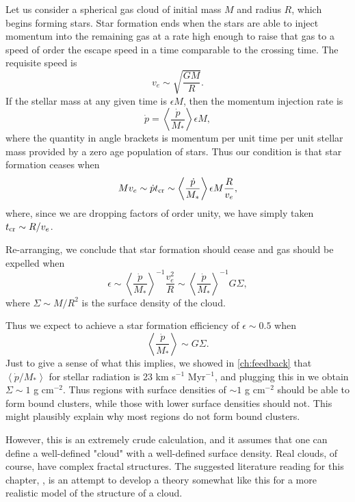 Let us consider a spherical gas cloud of initial mass $M$ and radius $R$, which begins forming stars. Star formation ends when the stars are able to inject momentum into the remaining gas at a rate high enough to raise that gas to a speed of order the escape speed in a time comparable to the crossing time. The requisite speed is
\begin{equation}
v_e \sim \sqrt{\frac{G M}{R}}.
\end{equation}
If the stellar mass at any given time is $\epsilon M$, then the momentum injection rate is
\begin{equation}
\dot{p} = \left\langle\frac{\dot{p}}{M_*}\right\rangle \epsilon M,
\end{equation}
where the quantity in angle brackets is momentum per unit time per unit stellar mass provided by a zero age population of stars. Thus our condition is that star formation ceases when
\begin{equation}
M v_e \sim \dot{p} t_{\rm cr} \sim \left\langle\frac{\dot{p}}{M_*}\right\rangle \epsilon M \frac{R}{v_e},
\end{equation}
where, since we are dropping factors of order unity, we have simply taken $t_{\rm cr} \sim R/v_e$.

Re-arranging, we conclude that star formation should cease and gas should be expelled when
\begin{equation}
\epsilon \sim \left\langle\frac{\dot{p}}{M_*}\right\rangle^{-1} \frac{v_e^2}{R} \sim \left\langle\frac{\dot{p}}{M_*}\right\rangle^{-1} G\Sigma,
\end{equation}
where $\Sigma \sim M/R^2$ is the surface density of the cloud.

Thus we expect to achieve a star formation efficiency of $\epsilon \sim 0.5$ when
\begin{equation}
\left\langle\frac{\dot{p}}{M_*}\right\rangle\sim G \Sigma.
\end{equation}
Just to give a sense of what this implies, we showed in \autoref{ch:feedback} that $\left\langle\dot{p}/M_*\right\rangle$ for stellar radiation is 23 km s$^{-1}$ Myr$^{-1}$, and plugging this in we obtain $\Sigma \sim 1$ g cm$^{-2}$. Thus regions with surface densities of $\sim 1$ g cm$^{-2}$ should be able to form bound clusters, while those with lower surface densities should not. This might plausibly explain why most regions do not form bound clusters.

However, this is an extremely crude calculation, and it assumes that one can define a well-defined "cloud" with a well-defined surface density. Real clouds, of course, have complex fractal structures. The suggested literature reading for this chapter, \citet{kruijssen12a}, is an attempt to develop a theory somewhat like this for a more realistic model of the structure of a cloud.

